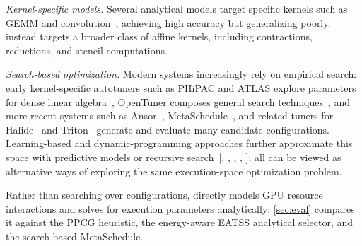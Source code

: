 \par\noindent\hspace*{\parindent}\textit{Kernel-specific models.} Several analytical models target specific kernels such as GEMM and convolution~\cite{anatomy,li-gemm,blis,saday-conv,conv-cache}, achieving high accuracy but generalizing poorly. \name instead targets a broader class of affine kernels, including contractions, reductions, and stencil computations.

\par\noindent\hspace*{\parindent}\textit{Search-based optimization.} Modern systems increasingly rely on empirical search: early kernel-specific autotuners such as PHiPAC and ATLAS explore parameters for dense linear algebra~\cite{phipac,atlas}, OpenTuner composes general search techniques~\cite{opentuner}, and more recent systems such as Ansor~\cite{ansor}, MetaSchedule~\cite{metaschedule}, and related tuners for Halide~\cite{automatichalide} and Triton~\cite{triton} generate and evaluate many candidate configurations. Learning-based and dynamic-programming approaches further approximate this space with predictive models or recursive search~{\hypersetup{citecolor=black}[, , , , ]}; all can be viewed as alternative ways of exploring the same execution-space optimization problem.

Rather than searching over configurations, \name directly models GPU resource interactions and solves for execution parameters analytically; \autoref{sec:eval} compares it against the PPCG heuristic, the energy-aware EATSS analytical selector, and the search-based MetaSchedule.
